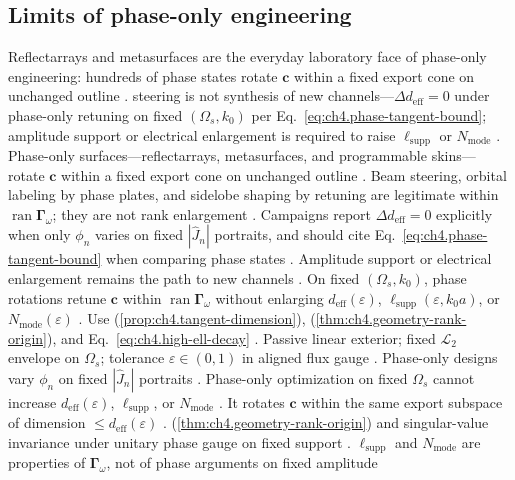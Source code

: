 \subsection{Limits of phase-only engineering}
\label{sec:ch492}
Reflectarrays and metasurfaces are the everyday laboratory face of phase-only engineering: hundreds of phase states rotate $\mathbf{c}$ within a fixed export cone on unchanged outline \cite{harrington2001}. steering is not synthesis of new channels---$\Delta d_{\mathrm{eff}}=0$ under phase-only retuning on fixed \((\Omega_s,k_0)\) per Eq.~\eqref{eq:ch4.phase-tangent-bound}; amplitude support or electrical enlargement is required to raise $\ell_{\mathrm{supp}}$ or $N_{\mathrm{mode}}$ \cite{devaney2004}.
\medskip
Phase-only surfaces---reflectarrays, metasurfaces, and programmable skins---rotate $\mathbf{c}$ within a fixed export cone on unchanged outline \cite{harrington2001}. Beam steering, orbital labeling by phase plates, and sidelobe shaping by retuning are legitimate within $\operatorname{ran}\boldsymbol{\Gamma}_\omega$; they are not rank enlargement \cite{devaney2004}.
Campaigns report $\Delta d_{\mathrm{eff}}=0$ explicitly when only $\phi_n$ varies on fixed $|\widehat{J}_n|$ portraits, and should cite Eq.~\eqref{eq:ch4.phase-tangent-bound} when comparing phase states \cite{stratton1941}. Amplitude support or electrical enlargement remains the path to new channels \cite{chu1948}.
On fixed \((\Omega_s,k_0)\), phase rotations retune $\mathbf{c}$ within $\operatorname{ran}\boldsymbol{\Gamma}_\omega$ without enlarging
\(d_{\mathrm{eff}}(\varepsilon)\), \(\ell_{\mathrm{supp}}(\varepsilon,k_{0}a)\), or \(N_{\mathrm{mode}}(\varepsilon)\) \cite{hansen1988}.
Use (\ref{prop:ch4.tangent-dimension}), (\ref{thm:ch4.geometry-rank-origin}), and Eq.~\eqref{eq:ch4.high-ell-decay}
\cite{stratton1941}. Passive linear exterior; fixed \(\mathcal{L}_{2}\) envelope on \(\Omega_{s}\); tolerance
\(\varepsilon\in(0,1)\) in aligned flux gauge \cite{jackson1999}. Phase-only designs vary \(\phi_{n}\) on fixed \(|\widehat{J}_{n}|\) portraits
\cite{collin2001}.
\label{prop:ch4.phase-only-ceiling}
Phase-only optimization on fixed $\Omega_s$ cannot increase $d_{\mathrm{eff}}(\varepsilon)$, $\ell_{\mathrm{supp}}$, or $N_{\mathrm{mode}}$ \cite{stratton1941}. It rotates $\mathbf{c}$ within the same export
subspace of dimension \(\le d_{\mathrm{eff}}(\varepsilon)\) \cite{devaney2004}.
(\ref{thm:ch4.geometry-rank-origin}) and singular-value invariance under unitary phase gauge on fixed support \cite{stratton1941}.
\(\ell_{\mathrm{supp}}\) and \(N_{\mathrm{mode}}\) are properties of \(\boldsymbol{\Gamma}_\omega\), not of phase arguments on fixed amplitude
